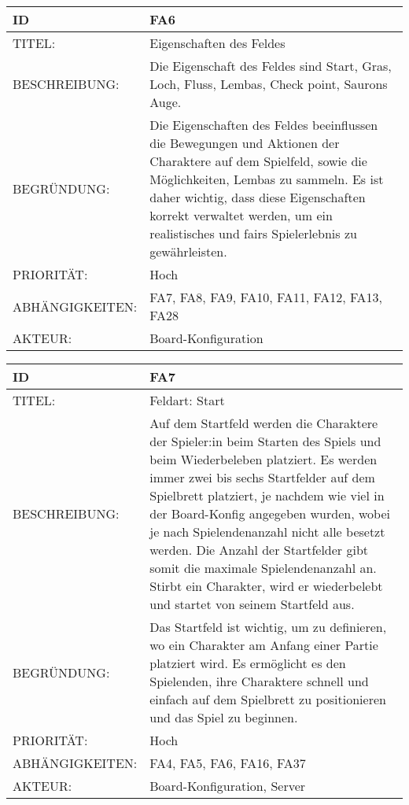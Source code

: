 \documentclass{uulm-assignment}
\begin{document}
    \begin{tabularx}{\textwidth}{|l|X |} \hline
        \textbf{ID} & \textbf{FA6} \\
        \hline
        TITEL: &  Eigenschaften des Feldes \\
        \hline
        BESCHREIBUNG: & Die Eigenschaft des Feldes sind Start, Gras, Loch, Fluss, Lembas, Check point, Saurons Auge.
        \\
        \hline
        BEGRÜNDUNG: & Die Eigenschaften des Feldes beeinflussen die Bewegungen und Aktionen der Charaktere auf dem Spielfeld, sowie die Möglichkeiten, Lembas zu sammeln. Es ist daher wichtig, dass diese Eigenschaften korrekt verwaltet werden, um ein realistisches und fairs Spielerlebnis zu gewährleisten. \\
        \hline
        PRIORITÄT: & Hoch\\
        \hline
        ABHÄNGIGKEITEN: & FA7, FA8, FA9, FA10, FA11, FA12, FA13, FA28\\
        \hline
        AKTEUR: & Board-Konfiguration \\
        \hline
    \end{tabularx}
    
    \begin{tabularx}{\textwidth}{|l|X |} \hline
        \textbf{ID} & \textbf{FA7} \\
        \hline
        TITEL: &  Feldart: Start\\
        \hline
        BESCHREIBUNG: & Auf dem Startfeld werden die Charaktere der Spieler:in beim Starten des
        Spiels und beim Wiederbeleben platziert. Es werden immer zwei bis sechs Startfelder auf dem Spielbrett platziert, je nachdem wie viel in der Board-Konfig angegeben
wurden, wobei je nach Spielendenanzahl nicht alle besetzt werden. Die Anzahl der
Startfelder gibt somit die maximale Spielendenanzahl an. Stirbt ein Charakter,
wird er wiederbelebt und startet von seinem Startfeld aus.
        \\
        \hline
        BEGRÜNDUNG: &  Das Startfeld ist wichtig, um zu definieren, wo ein Charakter am Anfang einer Partie platziert wird. Es ermöglicht es den Spielenden, ihre Charaktere schnell und einfach auf dem Spielbrett zu positionieren und das Spiel zu beginnen. \\
        \hline
        PRIORITÄT: & Hoch\\
        \hline
        ABHÄNGIGKEITEN: & FA4, FA5, FA6, FA16, FA37 \\
        \hline
        AKTEUR: &  Board-Konfiguration, Server \\
        \hline
    \end{tabularx}
    
\end{document}
